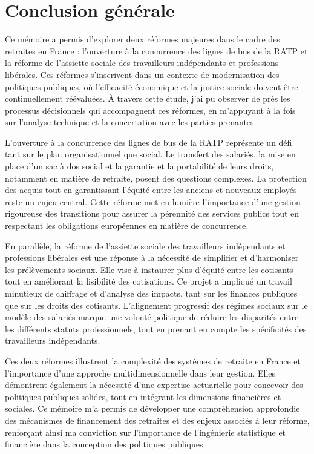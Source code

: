 \chapter{Conclusion générale} %


Ce mémoire a permis d’explorer deux réformes majeures dans le cadre des retraites en France : l’ouverture à la concurrence des lignes de bus de la RATP et la réforme de l’assiette sociale des travailleurs indépendants et professions libérales. Ces réformes s’inscrivent dans un contexte de modernisation des politiques publiques, où l’efficacité économique et la justice sociale doivent être continuellement réévaluées. À travers cette étude, j’ai pu observer de près les processus décisionnels qui accompagnent ces réformes, en m’appuyant à la fois sur l’analyse technique et la concertation avec les parties prenantes.

L’ouverture à la concurrence des lignes de bus de la RATP représente un défi tant sur le plan organisationnel que social. Le transfert des salariés, la mise en place d’un sac à dos social et la garantie et la portabilité de leurs droits, notamment en matière de retraite, posent des questions complexes. La protection des acquis tout en garantissant l’équité entre les anciens et nouveaux employés reste un enjeu central. Cette réforme met en lumière l’importance d’une gestion rigoureuse des transitions pour assurer la pérennité des services publics tout en respectant les obligations européennes en matière de concurrence.

En parallèle, la réforme de l’assiette sociale des travailleurs indépendants et professions libérales est une réponse à la nécessité de simplifier et d’harmoniser les prélèvements sociaux. Elle vise à instaurer plus d’équité entre les cotisants tout en améliorant la lisibilité des cotisations. Ce projet a impliqué un travail minutieux de chiffrage et d’analyse des impacts, tant sur les finances publiques que sur les droits des cotisants. L’alignement progressif des régimes sociaux sur le modèle des salariés marque une volonté politique de réduire les disparités entre les différents statuts professionnels, tout en prenant en compte les spécificités des travailleurs indépendants.

Ces deux réformes illustrent la complexité des systèmes de retraite en France et l’importance d’une approche multidimensionnelle dans leur gestion. Elles démontrent également la nécessité d’une expertise actuarielle pour concevoir des politiques publiques solides, tout en intégrant les dimensions financières et sociales. Ce mémoire m’a permis de développer une compréhension approfondie des mécanismes de financement des retraites et des enjeux associés à leur réforme, renforçant ainsi ma conviction sur l’importance de l’ingénierie statistique et financière dans la conception des politiques publiques.

